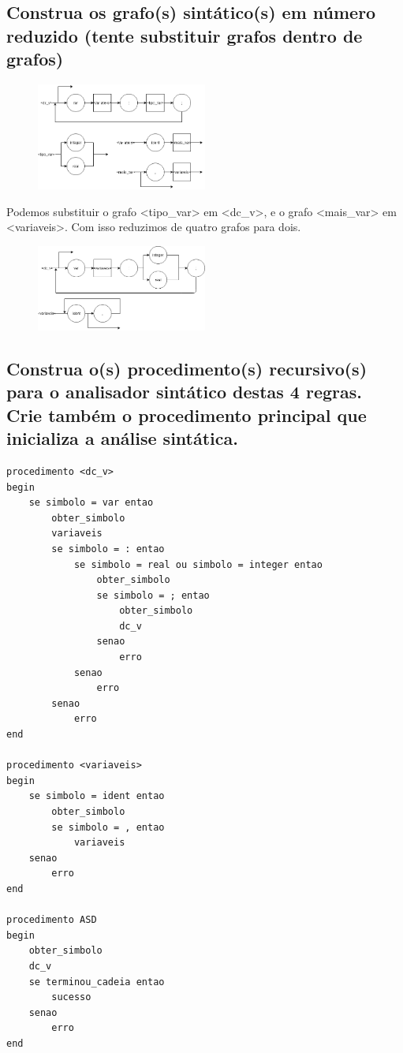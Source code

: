 \documentclass{article}
\begin{document}
\subsection{Construa os grafo(s) sintático(s) em número reduzido (tente substituir grafos dentro de grafos)}
\begin{figure}[ht!]
    \centering
    \includegraphics[width=0.5\textwidth]{p1/p1_grafo1.png}
\end{figure}
Podemos substituir o grafo <tipo\_var> em <dc\_v>, e o grafo <mais\_var> em <variaveis>. Com isso reduzimos de quatro grafos para dois.
\begin{figure}[ht!]
    \centering
    \includegraphics[width=0.5\textwidth]{p1/p1_grafo2.png}
\end{figure}

\subsection{Construa o(s) procedimento(s) recursivo(s) para o analisador sintático destas 4 regras. Crie
também o procedimento principal que inicializa a análise sintática.}
\begin{lstlisting}
procedimento <dc_v>
begin
    se simbolo = var entao
        obter_simbolo
        variaveis
        se simbolo = : entao
            se simbolo = real ou simbolo = integer entao
                obter_simbolo
                se simbolo = ; entao
                    obter_simbolo
                    dc_v
                senao
                    erro
            senao
                erro
        senao
            erro
end

procedimento <variaveis>
begin
    se simbolo = ident entao
        obter_simbolo
        se simbolo = , entao
            variaveis
    senao
        erro
end

procedimento ASD
begin
    obter_simbolo
    dc_v
    se terminou_cadeia entao
        sucesso
    senao
        erro
end
\end{lstlisting}
\end{document}
